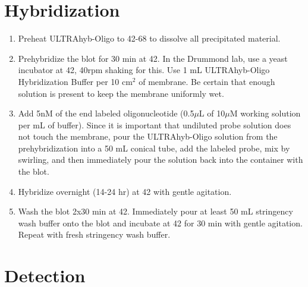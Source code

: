 \documentclass{article}
\newcommand{\mul}{\ensuremath{\mu}L\xspace}
\newcommand{\muM}{\ensuremath{\mu}M\xspace}
\newcommand{\degC}{\celsius\xspace}
\begin{document}
\section*{Hybridization}

\begin{enumerate}[resume]
\item Preheat ULTRAhyb-Oligo to 42-68\degC to dissolve all precipitated material. \label{step:prehyb}
\item Prehybridize the blot for 30 min at 42\degC. In the Drummond lab, use a yeast incubator at 42\degC, 40rpm shaking for this.
Use 1 mL ULTRAhyb-Oligo Hybridization Buffer per 10 cm$^2$ of membrane. Be certain that enough solution is present to keep the membrane uniformly wet.
\item Add 5nM of the end labeled oligonucleotide (0.5\mul of 10\muM working solution per mL of buffer). 
Since it is important that undiluted probe solution does not touch the membrane, pour the ULTRAhyb-Oligo solution from the prehybridization into a 50 mL conical tube, add the labeled probe, mix by swirling, and then immediately pour the solution back into the container with the blot.
\item Hybridize overnight (14-24 hr) at 42\degC with gentle agitation.
\item Wash the blot 2x30 min at 42\degC. Immediately pour at least 50 mL stringency wash buffer onto the blot and incubate at 42\degC for 30 min with gentle agitation. Repeat with fresh stringency wash buffer.
\end{enumerate}

\section*{Detection}
\label{sec:detect}

\end{document}

